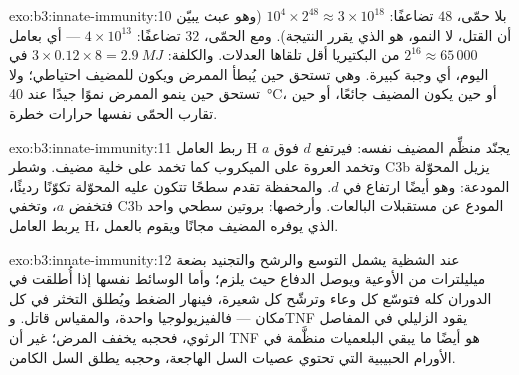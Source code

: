 \begin{solution}{exo:b3:innate-immunity:10}
بلا حمّى، $48$ تضاعفًا: $10^{4}\times 2^{48} \approx 3\times
10^{18}$ (وهو عبث يبيّن أن القتل، لا النمو، هو الذي يقرر
النتيجة). ومع الحمّى، $32$ تضاعفًا: $4\times 10^{13}$ --- أي بعامل
$2^{16} \approx 65\,000$ من البكتيريا أقل تلقاها العدلات.
والكلفة: $3\times 0.12\times 8 = \qty{2.9}{MJ}$ في اليوم، أي
وجبة كبيرة. وهي تستحق حين يُبطأ الممرض ويكون للمضيف
احتياطي؛ ولا تستحق حين ينمو الممرض نموًا جيدًا عند
\qty{40}{\celsius}، أو حين يكون المضيف جائعًا، أو حين تقارب
الحمّى نفسها حرارات خطرة.
\end{solution}

\begin{solution}{exo:b3:innate-immunity:11}
ربط العامل H يجنّد منظِّم المضيف نفسه: فيرتفع $d$ فوق $a$
وتخمد العروة على الميكروب كما تخمد على خلية مضيف. وشطر C3b
يزيل المحوّلة المودعة: وهو أيضًا ارتفاع في $d$. والمحفظة
تقدم سطحًا تتكون عليه المحوّلة تكوّنًا رديئًا، فتخفض $a$،
وتخفي C3b المودع عن مستقبلات البالعات. وأرخصها: بروتين سطحي
واحد يربط العامل H، الذي يوفره المضيف مجانًا ويقوم بالعمل.
\end{solution}

\begin{solution}{exo:b3:innate-immunity:12}
عند الشظية يشمل التوسع والرشح والتجنيد بضعة ميليلترات من
الأوعية ويوصل الدفاع حيث يلزم؛ وأما الوسائط نفسها إذا
أُطلقت في الدوران كله فتوسّع كل وعاء وترشّح كل شعيرة،
فينهار الضغط ويُطلق التخثر في كل مكان --- فالفيزيولوجيا
واحدة، والمقياس قاتل. وTNF يقود  الزليلي في 
المفاصل الرثوي، فحجبه يخفف المرض؛ غير أن TNF هو أيضًا ما
يبقي البلعميات منظَّمة في الأورام الحبيبية التي تحتوي عصيات
السل الهاجعة، وحجبه يطلق السل الكامن.
\end{solution}

